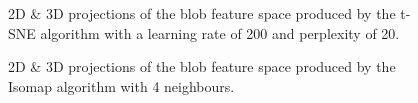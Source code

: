 \begin{figure}[H]
	\centering
	\caption{2D \& 3D projections of the blob feature space produced by the t-SNE algorithm with a learning rate of 200 and perplexity of 20.}\label{fig:blob_SNE_mapping}
\end{figure}

\begin{figure}[H]
	\centering
	\caption{2D \& 3D projections of the blob feature space  produced by the Isomap algorithm with 4 neighbours.}\label{fig:blob_iso_mapping}
\end{figure}

